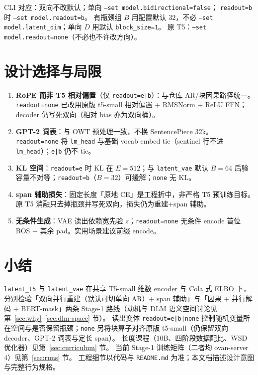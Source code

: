 \documentclass[UTF8,a4paper,11pt]{ctexart}
\begin{document}
CLI 对应：双向不改默认；单向 \texttt{--set model.bidirectional=false}；
\texttt{readout=b} 时 \texttt{--set model.readout=b}。
有瓶颈组 $B$ 用配置默认 $32$，不必 \texttt{--set model.latent\_dim}；单向 $D$ 用默认 \texttt{block\_size=1}。
原 T5：\texttt{--set model.readout=none}（不必也不许改方向）。

\section{设计选择与局限}

\begin{enumerate}
  \item \textbf{RoPE 而非 T5 相对偏置}（仅 \texttt{readout=e|b}）：与仓库 AR/块因果路径统一。\texttt{readout=none} 已改用原版 t5-small 相对偏置 + RMSNorm + ReLU FFN；decoder 仍写死双向（相对 bias 亦为双向桶）。
  \item \textbf{GPT-2 词表}：与 OWT 预处理一致，不换 SentencePiece 32k。\texttt{readout=none} 将 \texttt{lm\_head} 与基础 vocab embed tie（sentinel 行不进 \texttt{lm\_head}）；\texttt{e|b} 仍不 tie。
  \item \textbf{KL 空间}：\texttt{readout=e} 时 KL 在 $E{=}512$；与 \texttt{latent\_vae} 默认 $B{=}64$ 后验容量不对等；\texttt{readout=b}（$B{=}32$）可缓解；\texttt{none} 无 KL。
  \item \textbf{span 辅助损失}：固定长度「原地 CE」是工程折中，非严格 T5 预训练目标。原 T5 消融只去掉瓶颈并写死双向，损失仍为重建+span 辅助。
  \item \textbf{无条件生成}：VAE 读出依赖宽先验 $z$；\texttt{readout=none} 无条件 encode 首位 BOS + 其余 pad。实用场景建议前缀 encode。
\end{enumerate}

\section{小结}

\texttt{latent\_t5} 与 \texttt{latent\_vae} 在共享 T5-small 维数 encoder 与 Cola 式 ELBO 下，分别检验「双向并行重建（默认可切单向 AR）+ span 辅助」与「因果 + 并行解码 + BERT-mask」两条 Stage-1 路线（动机与 DLM 语义空间讨论见第~\ref{sec:why}--\ref{sec:dlm-space} 节）。
读出变体 \texttt{readout=e|b|none} 控制随机变量所在空间与是否保留瓶颈；\texttt{none} 另将块算子对齐原版 t5-small（仍保留双向 decoder、GPT-2 词表与定长 span）。
长度课程（10B、四阶段数据配比、WSD 优化器）见第~\ref{sec:curriculum} 节。
当前 Stage-1 训练矩阵（二者均 ovan-server 4）见第~\ref{sec:runs} 节。
工程细节以代码与 \texttt{README.md} 为准；本文档描述设计意图与完整行为规格。

\printbibliography
\end{document}
